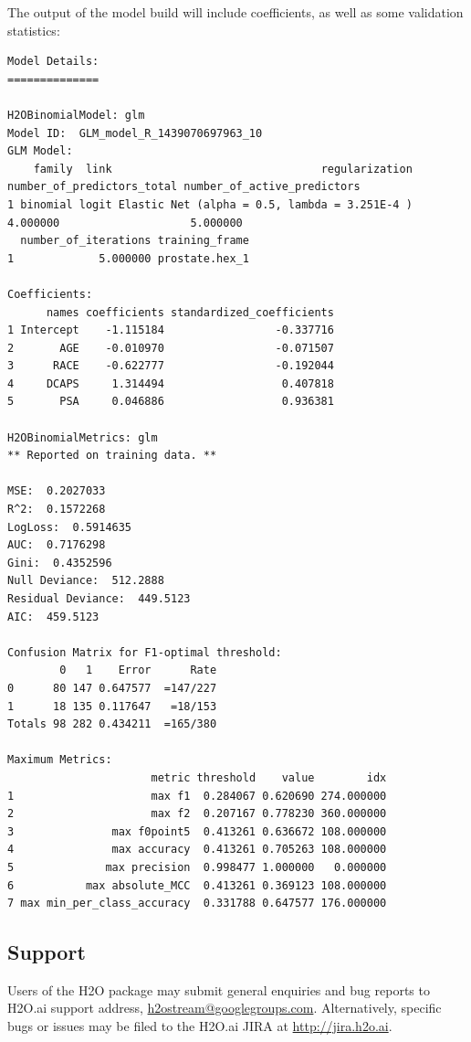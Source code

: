 \documentclass[11pt]{article}
\begin{document}
The output of the model build will include coefficients, as well as some validation statistics:
\begin{lstlisting}[style=output]
Model Details:
==============

H2OBinomialModel: glm
Model ID:  GLM_model_R_1439070697963_10 
GLM Model:
    family  link                                regularization number_of_predictors_total number_of_active_predictors
1 binomial logit Elastic Net (alpha = 0.5, lambda = 3.251E-4 )                   4.000000                    5.000000
  number_of_iterations training_frame
1             5.000000 prostate.hex_1

Coefficients:
      names coefficients standardized_coefficients
1 Intercept    -1.115184                 -0.337716
2       AGE    -0.010970                 -0.071507
3      RACE    -0.622777                 -0.192044
4     DCAPS     1.314494                  0.407818
5       PSA     0.046886                  0.936381

H2OBinomialMetrics: glm
** Reported on training data. **

MSE:  0.2027033
R^2:  0.1572268
LogLoss:  0.5914635
AUC:  0.7176298
Gini:  0.4352596
Null Deviance:  512.2888
Residual Deviance:  449.5123
AIC:  459.5123

Confusion Matrix for F1-optimal threshold:
        0   1    Error      Rate
0      80 147 0.647577  =147/227
1      18 135 0.117647   =18/153
Totals 98 282 0.434211  =165/380

Maximum Metrics:
                      metric threshold    value        idx
1                     max f1  0.284067 0.620690 274.000000
2                     max f2  0.207167 0.778230 360.000000
3               max f0point5  0.413261 0.636672 108.000000
4               max accuracy  0.413261 0.705263 108.000000
5              max precision  0.998477 1.000000   0.000000
6           max absolute_MCC  0.413261 0.369123 108.000000
7 max min_per_class_accuracy  0.331788 0.647577 176.000000
\end{lstlisting}

\subsection{Support} 

Users of the H2O package may submit general enquiries and bug reports to H2O.ai support address, \mbox{\url{h2ostream@googlegroups.com}}.  Alternatively, specific bugs or issues may be filed to the H2O.ai JIRA at \mbox{\url{http://jira.h2o.ai}}.
\end{document}
